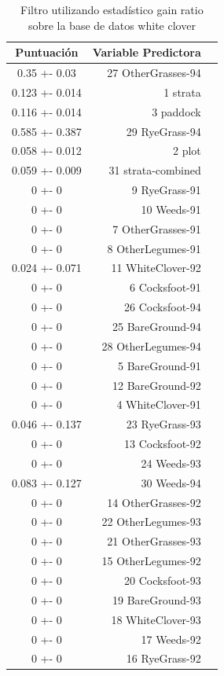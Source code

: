 \documentclass[es]{ifirak}
\begin{document}
\begin{table}[htbp]
	\centering
	\begin{tabular}{|c|rl|}
		  Puntuación   & Variable Predictora &  \\ \hline
		0.35  +- 0.03  &  27 OtherGrasses-94 &  \\
		0.123 +- 0.014 &            1 strata &  \\
		0.116 +- 0.014 &           3 paddock &  \\
		0.585 +- 0.387 &      29 RyeGrass-94 &  \\
		0.058 +- 0.012 &              2 plot &  \\
		0.059 +- 0.009 &  31 strata-combined &  \\
		  0     +- 0   &       9 RyeGrass-91 &  \\
		  0     +- 0   &         10 Weeds-91 &  \\
		  0     +- 0   &   7 OtherGrasses-91 &  \\
		  0     +- 0   &   8 OtherLegumes-91 &  \\
		0.024 +- 0.071 &   11 WhiteClover-92 &  \\
		  0     +- 0   &      6 Cocksfoot-91 &  \\
		  0     +- 0   &     26 Cocksfoot-94 &  \\
		  0     +- 0   &    25 BareGround-94 &  \\
		  0     +- 0   &  28 OtherLegumes-94 &  \\
		  0     +- 0   &     5 BareGround-91 &  \\
		  0     +- 0   &    12 BareGround-92 &  \\
		  0     +- 0   &    4 WhiteClover-91 &  \\
		0.046 +- 0.137 &      23 RyeGrass-93 &  \\
		  0     +- 0   &     13 Cocksfoot-92 &  \\
		  0     +- 0   &         24 Weeds-93 &  \\
		0.083 +- 0.127 &         30 Weeds-94 &  \\
		  0     +- 0   &  14 OtherGrasses-92 &  \\
		  0     +- 0   &  22 OtherLegumes-93 &  \\
		  0     +- 0   &  21 OtherGrasses-93 &  \\
		  0     +- 0   &  15 OtherLegumes-92 &  \\
		  0     +- 0   &     20 Cocksfoot-93 &  \\
		  0     +- 0   &    19 BareGround-93 &  \\
		  0     +- 0   &   18 WhiteClover-93 &  \\
		  0     +- 0   &         17 Weeds-92 &  \\
		  0     +- 0   &      16 RyeGrass-92 &
	\end{tabular}
	\caption{Filtro utilizando estadístico gain ratio sobre la base de datos white clover}\label{table}
\end{table}
\end{document}
